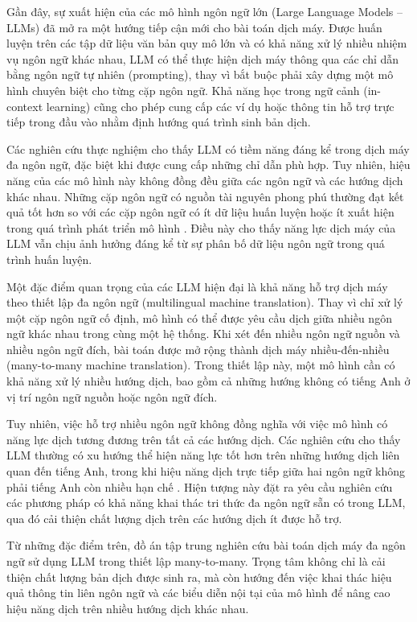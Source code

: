 Gần đây, sự xuất hiện của các mô hình ngôn ngữ lớn (Large Language Models -- LLMs) đã mở ra một hướng tiếp cận mới cho bài toán dịch máy. Được huấn luyện trên các tập dữ liệu văn bản quy mô lớn và có khả năng xử lý nhiều nhiệm vụ ngôn ngữ khác nhau, LLM có thể thực hiện dịch máy thông qua các chỉ dẫn bằng ngôn ngữ tự nhiên (prompting), thay vì bắt buộc phải xây dựng một mô hình chuyên biệt cho từng cặp ngôn ngữ. Khả năng học trong ngữ cảnh (in-context learning) cũng cho phép cung cấp các ví dụ hoặc thông tin hỗ trợ trực tiếp trong đầu vào nhằm định hướng quá trình sinh bản dịch.

Các nghiên cứu thực nghiệm cho thấy LLM có tiềm năng đáng kể trong dịch máy đa ngôn ngữ, đặc biệt khi được cung cấp những chỉ dẫn phù hợp. Tuy nhiên, hiệu năng của các mô hình này không đồng đều giữa các ngôn ngữ và các hướng dịch khác nhau. Những cặp ngôn ngữ có nguồn tài nguyên phong phú thường đạt kết quả tốt hơn so với các cặp ngôn ngữ có ít dữ liệu huấn luyện hoặc ít xuất hiện trong quá trình phát triển mô hình \cite{zhu-etal-2024-multilingual}. Điều này cho thấy năng lực dịch máy của LLM vẫn chịu ảnh hưởng đáng kể từ sự phân bố dữ liệu ngôn ngữ trong quá trình huấn luyện.

Một đặc điểm quan trọng của các LLM hiện đại là khả năng hỗ trợ dịch máy theo thiết lập đa ngôn ngữ (multilingual machine translation). Thay vì chỉ xử lý một cặp ngôn ngữ cố định, mô hình có thể được yêu cầu dịch giữa nhiều ngôn ngữ khác nhau trong cùng một hệ thống. Khi xét đến nhiều ngôn ngữ nguồn và nhiều ngôn ngữ đích, bài toán được mở rộng thành dịch máy nhiều-đến-nhiều (many-to-many machine translation). Trong thiết lập này, một mô hình cần có khả năng xử lý nhiều hướng dịch, bao gồm cả những hướng không có tiếng Anh ở vị trí ngôn ngữ nguồn hoặc ngôn ngữ đích.

Tuy nhiên, việc hỗ trợ nhiều ngôn ngữ không đồng nghĩa với việc mô hình có năng lực dịch tương đương trên tất cả các hướng dịch. Các nghiên cứu cho thấy LLM thường có xu hướng thể hiện năng lực tốt hơn trên những hướng dịch liên quan đến tiếng Anh, trong khi hiệu năng dịch trực tiếp giữa hai ngôn ngữ không phải tiếng Anh còn nhiều hạn chế \cite{zhu-etal-2024-multilingual,yang-etal-2025-enanchored}. Hiện tượng này đặt ra yêu cầu nghiên cứu các phương pháp có khả năng khai thác tri thức đa ngôn ngữ sẵn có trong LLM, qua đó cải thiện chất lượng dịch trên các hướng dịch ít được hỗ trợ.

Từ những đặc điểm trên, đồ án tập trung nghiên cứu bài toán dịch máy đa ngôn ngữ sử dụng LLM trong thiết lập many-to-many. Trọng tâm không chỉ là cải thiện chất lượng bản dịch được sinh ra, mà còn hướng đến việc khai thác hiệu quả thông tin liên ngôn ngữ và các biểu diễn nội tại của mô hình để nâng cao hiệu năng dịch trên nhiều hướng dịch khác nhau.

